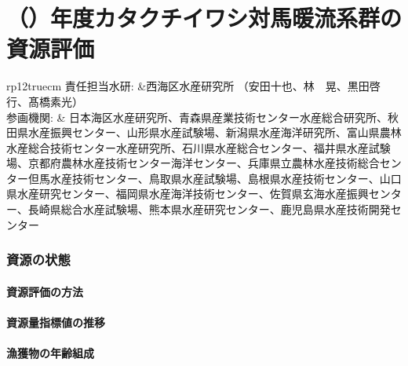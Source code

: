 \chapter{\thisyrjp（\thisyrad）年度カタクチイワシ対馬暖流系群の資源評価}

\begin{table}[h]
\begin{tabular}{{rp{12truecm}}}
責任担当水研: &西海区水産研究所 （安田十也、林　晃、黒田啓行、髙橋素光）\\
参画機関: & 日本海区水産研究所、青森県産業技術センター水産総合研究所、秋田県水産振興センター、山形県水産試験場、新潟県水産海洋研究所、富山県農林水産総合技術センター水産研究所、石川県水産総合センター、福井県水産試験場、京都府農林水産技術センター海洋センター、兵庫県立農林水産技術総合センター但馬水産技術センター、鳥取県水産試験場、島根県水産技術センター、山口県水産研究センター、福岡県水産海洋技術センター、佐賀県玄海水産振興センター、長崎県総合水産試験場、熊本県水産研究センター、鹿児島県水産技術開発センター
\end{tabular}
\end{table}






\subsection{資源の状態}
\subsubsection{資源評価の方法}
\subsubsection{資源量指標値の推移}
\subsubsection{漁獲物の年齢組成}
